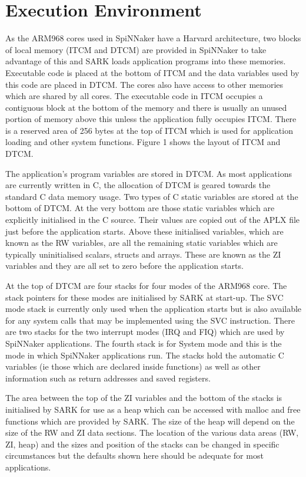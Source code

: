 \section{Execution Environment}

As the ARM968 cores used in SpiNNaker have a Harvard architecture, two
blocks of local memory (ITCM and DTCM) are provided in SpiNNaker to
take advantage of this and SARK loads application programs into these
memories. Executable code is placed at the bottom of ITCM and the data
variables used by this code are placed in DTCM. The cores also have
access to other memories which are shared by all cores. The executable
code in ITCM occupies a contiguous block at the bottom of the memory
and there is usually an unused portion of memory above this unless the
application fully occupies ITCM. There is a reserved area of 256 bytes
at the top of ITCM which is used for application loading and other
system functions. Figure 1 shows the layout of ITCM and DTCM.


The application's program variables are stored in DTCM. As most
applications are currently written in C, the allocation of DTCM is
geared towards the standard C data memory usage. Two types of C static
variables are stored at the bottom of DTCM. At the very bottom are
those static variables which are explicitly initialised in the C
source. Their values are copied out of the APLX file just before the
application starts. Above these initialised variables, which are known
as the RW variables, are all the remaining static variables which are
typically uninitialised scalars, structs and arrays. These are known
as the ZI variables and they are all set to zero before the
application starts.

At the top of DTCM are four stacks for four modes of the ARM968 core.
The stack pointers for these modes are initialised by SARK at start-up.
The SVC mode stack is currently only used when the application starts
but is also available for any system calls that may be implemented
using the SVC instruction. There are two stacks for the two interrupt
modes (IRQ and FIQ) which are used by SpiNNaker applications. The
fourth stack is for System mode and this is the mode in which SpiNNaker
applications run. The stacks hold the automatic C variables (ie those
which are declared inside functions) as well as other information such
as return addresses and saved registers.

The area between the top of the ZI variables and the bottom of the
stacks is initialised by SARK for use as a heap which can be accessed
with malloc and free functions which are provided by SARK. The size of
the heap will depend on the size of the RW and ZI data sections. The
location of the various data areas (RW, ZI, heap) and the sizes and
position of the stacks can be changed in specific circumstances but
the defaults shown here should be adequate for most applications.

